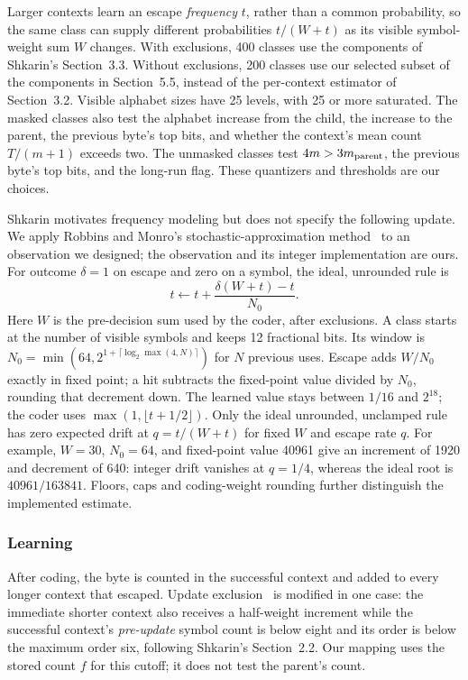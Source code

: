 \documentclass[10pt,letterpaper]{article}
\begin{document}
Larger contexts learn an escape \emph{frequency} $t$, rather than a common probability, so the same class can supply different probabilities $t/(W+t)$ as its visible symbol-weight sum $W$ changes. With exclusions, 400 classes use the components of Shkarin's Section~3.3. Without exclusions, 200 classes use our selected subset of the components in Section~5.5, instead of the per-context estimator of Section~3.2. Visible alphabet sizes have 25 levels, with 25 or more saturated. The masked classes also test the alphabet increase from the child, the increase to the parent, the previous byte's top bits, and whether the context's mean count $T/(m+1)$ exceeds two. The unmasked classes test $4m>3m_{\rm parent}$, the previous byte's top bits, and the long-run flag. These quantizers and thresholds are our choices.

Shkarin motivates frequency modeling but does not specify the following update. We apply Robbins and Monro's stochastic-approximation method~\cite{robbinsmonro} to an observation we designed; the observation and its integer implementation are ours. For outcome $\delta=1$ on escape and zero on a symbol, the ideal, unrounded rule is
\begin{equation}
 t\leftarrow t+\frac{\delta(W+t)-t}{N_0}.
\end{equation}
Here $W$ is the pre-decision sum used by the coder, after exclusions. A class starts at the number of visible symbols and keeps 12 fractional bits. Its window is $N_0=\min(64,2^{1+\lceil\log_2\max(4,N)\rceil})$ for $N$ previous uses. Escape adds $W/N_0$ exactly in fixed point; a hit subtracts the fixed-point value divided by $N_0$, rounding that decrement down. The learned value stays between $1/16$ and $2^{18}$; the coder uses $\max(1,\lfloor t+1/2\rfloor)$. Only the ideal unrounded, unclamped rule has zero expected drift at $q=t/(W+t)$ for fixed $W$ and escape rate $q$. For example, $W=30$, $N_0=64$, and fixed-point value 40961 give an increment of 1920 and decrement of 640: integer drift vanishes at $q=1/4$, whereas the ideal root is $40961/163841$. Floors, caps and coding-weight rounding further distinguish the implemented estimate.

\subsubsection{Learning}
After coding, the byte is counted in the successful context and added to every longer context that escaped. Update exclusion~\cite{moffatppm} is modified in one case: the immediate shorter context also receives a half-weight increment while the successful context's \emph{pre-update} symbol count is below eight and its order is below the maximum order six, following Shkarin's Section~2.2. Our mapping uses the stored count $f$ for this cutoff; it does not test the parent's count.
\end{document}
